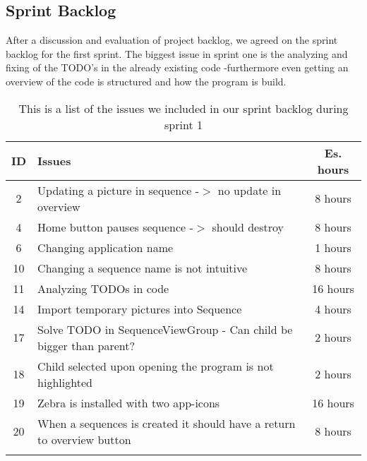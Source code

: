 \subsection{Sprint Backlog}\label{subsec:spr1_sprblog}
After a discussion and evaluation of project backlog, we agreed on the sprint backlog for the first sprint. The biggest issue in sprint one is the analyzing and fixing of the TODO's in the already existing code -furthermore even getting an overview of the code is structured and how the program is build.
\begin{longtable} { | c | p{12cm} | c | } 
\hline
	ID 	&	Issues	&		 Es. hours \\\hline
	2	& 	Updating a picture in sequence -$>$ no update in overview	&	8 hours	\\\hline
	4	& 	Home button pauses sequence -$>$ should destroy	&	8 hours	\\\hline
	6	& 	Changing application name	&	1 hours	\\\hline
	10	& 	Changing a sequence name is not intuitive	&	8 hours	\\\hline
	11	& 	Analyzing TODOs in code	&	16 hours	\\\hline
	14	& 	Import temporary pictures into Sequence	&	4 hours	\\\hline
	17	& 	Solve TODO in SequenceViewGroup - Can child be bigger than parent?	&	2 hours	\\\hline
	18	& 	Child selected upon opening the program is not highlighted	&	2 hours	\\\hline
	19	& 	Zebra is installed with two app-icons	&	16 hours	\\\hline
	20	& 	When a sequences is created it should have a return to overview button	&	8 hours	\\\hline
\caption{This is a list of the issues we included in our sprint backlog during sprint 1}
\label{tab:spr1_sprintblog}
\end{longtable}
